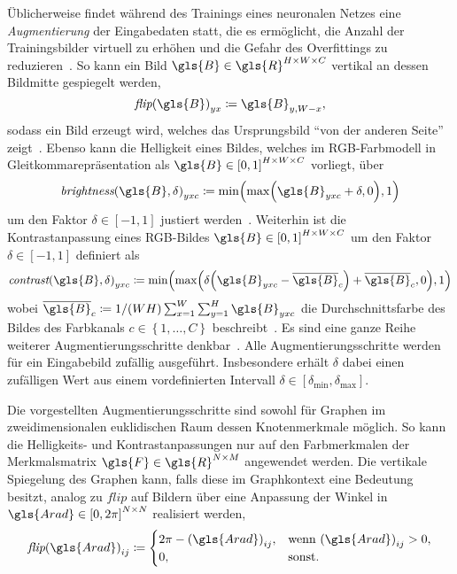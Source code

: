 Üblicherweise findet während des Trainings eines neuronalen Netzes eine \emph{Augmentierung} der Eingabedaten statt, die es ermöglicht, die Anzahl der Trainingsbilder virtuell zu erhöhen und die Gefahr des Overfittings zu reduzieren~\cite{tensorflow}.
So kann \zB{} ein Bild $\gls{B} \in \gls{R}^{H \times W \times C}$ vertikal an dessen Bildmitte gespiegelt werden, \dhe{}
\begin{equation*}
  {\textit{flip}\left(\gls{B}\right)}_{yx} \coloneqq \gls{B}_{y,W-x},
\end{equation*}
sodass ein Bild erzeugt wird, welches das Ursprungsbild \enquote{von der anderen Seite} zeigt~\cite{tensorflow}.
Ebenso kann die Helligkeit eines Bildes, welches im RGB-Farbmodell in Gleitkommarepräsentation als $\gls{B} \in {\left[0, 1\right]}^{H \times W \times C}$ vorliegt, über
\begin{equation*}
  {\textit{brightness}\left(\gls{B}, \delta \right)}_{yxc} \coloneqq \min \left( \max \left(\gls{B}_{yxc} + \delta, 0\right), 1\right)
\end{equation*}
um den Faktor $\delta \in \left[-1, 1\right]$ justiert werden~\cite{tensorflow}.
Weiterhin ist die Kontrastanpassung eines RGB-Bildes $\gls{B} \in {\left[0, 1\right]}^{H \times W \times C}$ um den Faktor $\delta \in \left[-1, 1\right]$ definiert als
\begin{equation*}
  {\textit{contrast}\left(\gls{B}, \delta\right)}_{yxc} \coloneqq \min \left( \max \left(\delta \left(\gls{B}_{yxc} - \overline{\gls{B}}_c\right) + \overline{\gls{B}}_c, 0\right), 1 \right)
\end{equation*}
wobei $\overline{\gls{B}}_c \coloneqq 1/\left(WH\right) \sum_{x = 1}^W \sum_{y = 1}^H \gls{B}_{yxc}$ die Durchschnittsfarbe des Bildes \bzgl{} des Farbkanals $c \in \left\{1, \ldots, C\right\}$ beschreibt~\cite{tensorflow}.
Es sind eine ganze Reihe weiterer Augmentierungsschritte denkbar~\cite{tensorflow}.
Alle Augmentierungsschritte werden für ein Eingabebild zufällig ausgeführt.
Insbesondere erhält $\delta$ dabei einen zufälligen Wert aus einem vordefinierten Intervall $\delta \in \left[\delta_{\min}, \delta_{\max}\right]$.

Die vorgestellten Augmentierungsschritte sind sowohl für Graphen im zweidimensionalen euklidischen Raum \bzw{} dessen Knotenmerkmale möglich.
So kann \bspw{} die Helligkeits- und Kontrastanpassungen nur auf den Farbmerkmalen der Merkmalsmatrix $\gls{F} \in \gls{R}^{N \times M}$ angewendet werden.
Die vertikale Spiegelung des Graphen kann, falls diese im Graphkontext eine Bedeutung besitzt, analog zu $\textit{flip}$ auf Bildern über eine Anpassung der Winkel in $\gls{Arad} \in {\left[0, 2\pi\right]}^{N \times N}$ realisiert werden, \dhe{}
\begin{equation*}
  {\textit{flip}\left(\gls{Arad}\right)}_{ij} \coloneqq \begin{cases}
    2\pi - {\left(\gls{Arad}\right)}_{ij}, & \text{wenn } {\left(\gls{Arad}\right)}_{ij} > 0,\\
    0, & \text{sonst.}
  \end{cases}
\end{equation*}

